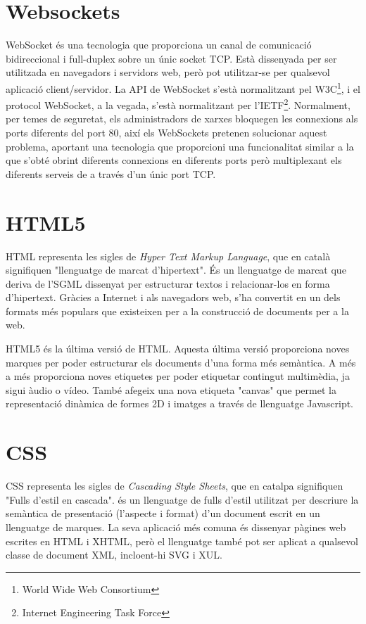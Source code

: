 \section{Websockets}
\label{sec:websockets}

WebSocket és una tecnologia que proporciona un canal de comunicació bidireccional i full-duplex sobre un únic socket TCP. Està dissenyada per ser utilitzada en navegadors i servidors web, però pot utilitzar-se per qualsevol aplicació client/servidor. La API de WebSocket s'està normalitzant pel W3C\footnote{World Wide Web Consortium}, i el protocol WebSocket, a la vegada, s'està normalitzant per l'IETF\footnote{Internet Engineering Task Force}. Normalment, per temes de seguretat, els administradors de xarxes bloquegen les connexions als ports diferents del port 80, així els WebSockets pretenen solucionar aquest problema, aportant una tecnologia que proporcioni una funcionalitat similar a la que s'obté obrint diferents connexions en diferents ports però multiplexant els diferents serveis de a través d'un únic port TCP.

\section{HTML5}

HTML representa les sigles de \emph{Hyper Text Markup Language}, que en català signifiquen "llenguatge de marcat d'hipertext". És un llenguatge de marcat que deriva de l'SGML dissenyat per estructurar textos i relacionar-los en forma d'hipertext. Gràcies a Internet i als navegadors web, s'ha convertit en un dels formats més populars que existeixen per a la construcció de documents per a la web. 

HTML5 és la última versió de HTML. Aquesta última versió proporciona noves marques per poder estructurar els documents d'una forma més semàntica. A més a més proporciona noves etiquetes per poder etiquetar contingut multimèdia, ja sigui àudio o vídeo. També afegeix una nova etiqueta "canvas" que permet la representació dinàmica de formes 2D i imatges a través de llenguatge Javascript. 

\section{CSS}

CSS representa les sigles de \emph{Cascading Style Sheets}, que en catalpa signifiquen "Fulls d'estil en cascada". és un llenguatge de fulls d'estil utilitzat per descriure la semàntica de presentació (l'aspecte i format) d'un document escrit en un llenguatge de marques. La seva aplicació més comuna és dissenyar pàgines web escrites en HTML i XHTML, però el llenguatge també pot ser aplicat a qualsevol classe de document XML, incloent-hi SVG i XUL.


